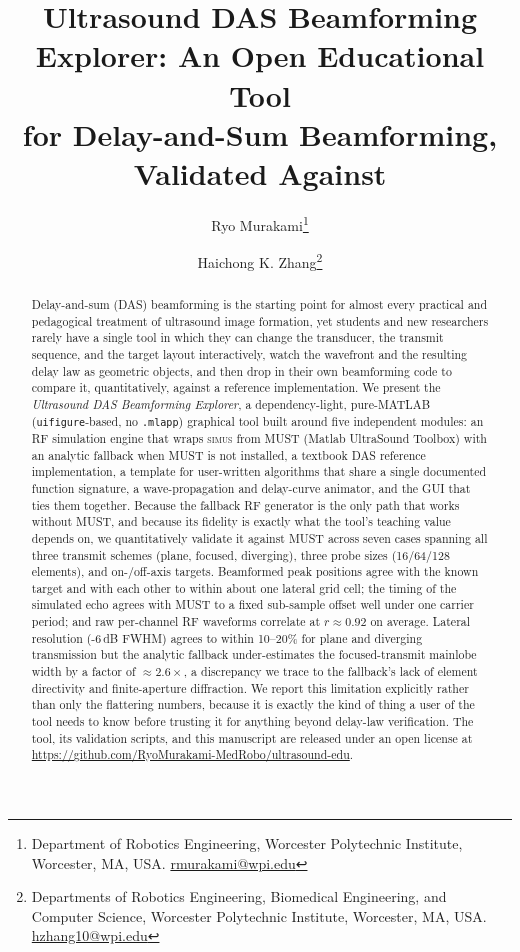 \documentclass[11pt]{article}
\title{Ultrasound DAS Beamforming Explorer: An Open Educational Tool\\
for Delay-and-Sum Beamforming, Validated Against \must}
\author{
Ryo Murakami\thanks{Department of Robotics Engineering, Worcester
Polytechnic Institute, Worcester, MA, USA.
\href{mailto:rmurakami@wpi.edu}{rmurakami@wpi.edu}}
\and
Haichong K. Zhang\thanks{Departments of Robotics Engineering, Biomedical
Engineering, and Computer Science, Worcester Polytechnic Institute,
Worcester, MA, USA. \href{mailto:hzhang10@wpi.edu}{hzhang10@wpi.edu}}
}
\date{}
\newcommand{\code}[1]{\texttt{#1}}
\newcommand{\must}{MUST}
\begin{document}
\maketitle

\begin{abstract}
Delay-and-sum (DAS) beamforming is the starting point for almost every
practical and pedagogical treatment of ultrasound image formation, yet
students and new researchers rarely have a single tool in which they can
change the transducer, the transmit sequence, and the target layout
interactively, watch the wavefront and the resulting delay law as geometric
objects, and then drop in their own beamforming code to compare it,
quantitatively, against a reference implementation. We present the
\emph{Ultrasound DAS Beamforming Explorer}, a dependency-light, pure-MATLAB
(\code{uifigure}-based, no \code{.mlapp}) graphical tool built around five
independent modules: an RF simulation engine that wraps \textsc{simus} from
\must{} (Matlab UltraSound Toolbox) with an analytic fallback when \must{}
is not installed, a textbook DAS reference implementation, a template for
user-written algorithms that share a single documented function signature,
a wave-propagation and delay-curve animator, and the GUI that ties them
together. Because the fallback RF generator is the only path that works
without \must{}, and because its fidelity is exactly what the tool's
teaching value depends on, we quantitatively validate it against \must{}
across seven cases spanning all three transmit schemes (plane, focused,
diverging), three probe sizes (16/64/128 elements), and on-/off-axis
targets. Beamformed peak positions agree with the known target and with
each other to within about one lateral grid cell; the timing of the
simulated echo agrees with \must{} to a fixed sub-sample offset well under
one carrier period; and raw per-channel RF waveforms correlate at
$r \approx 0.92$ on average. Lateral resolution (-6\,dB FWHM) agrees to
within 10--20\% for plane and diverging transmission but the analytic
fallback under-estimates the focused-transmit mainlobe width by a factor of
$\approx 2.6\times$, a discrepancy we trace to the fallback's lack of
element directivity and finite-aperture diffraction. We report this
limitation explicitly rather than only the flattering numbers, because it
is exactly the kind of thing a user of the tool needs to know before
trusting it for anything beyond delay-law verification. The tool, its
validation scripts, and this manuscript are released under an open license
at \url{https://github.com/RyoMurakami-MedRobo/ultrasound-edu}.
\end{abstract}
\end{document}
